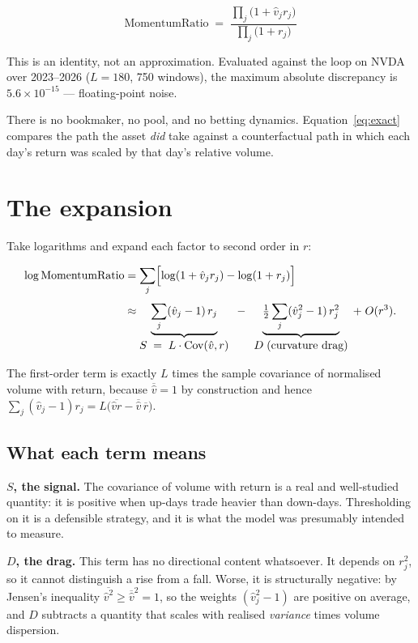 \documentclass[11pt,a4paper]{article}
\newcommand{\vhat}{\hat{v}}
\begin{document}
\begin{equation}
\boxed{\;\;
\text{MomentumRatio} \;=\; \frac{\prod_{j}\bigl(1 + \vhat_j r_j\bigr)}{\prod_{j}\bigl(1 + r_j\bigr)}
\;\;}
\label{eq:exact}
\end{equation}

This is an identity, not an approximation. Evaluated against the loop on NVDA over
2023--2026 ($L=180$, 750 windows), the maximum absolute discrepancy is
$5.6 \times 10^{-15}$ --- floating-point noise.

There is no bookmaker, no pool, and no betting dynamics. Equation~\eqref{eq:exact} compares
the path the asset \emph{did} take against a counterfactual path in which each day's return
was scaled by that day's relative volume.

\section{The expansion}

Take logarithms and expand each factor to second order in $r$:

\begin{align}
\log \text{MomentumRatio}
&= \sum_j \Bigl[ \log(1 + \vhat_j r_j) - \log(1 + r_j) \Bigr] \nonumber \\[0.3em]
&\approx \underbrace{\sum_j (\vhat_j - 1)\, r_j}_{\textstyle S \;=\; L \cdot \mathrm{Cov}(\vhat, r)}
\;\;-\;\; \underbrace{\tfrac{1}{2}\sum_j (\vhat_j^2 - 1)\, r_j^2}_{\textstyle D \;\text{(curvature drag)}}
\;+\; O(r^3).
\label{eq:expand}
\end{align}

The first-order term is exactly $L$ times the sample covariance of normalised volume with
return, because $\overline{\vhat} = 1$ by construction and hence
$\sum_j (\vhat_j - 1) r_j = L\bigl(\overline{\vhat r} - \overline{\vhat}\,\overline{r}\bigr)$.

\subsection*{What each term means}

\textbf{$S$, the signal.} The covariance of volume with return is a real and well-studied
quantity: it is positive when up-days trade heavier than down-days. Thresholding on it is a
defensible strategy, and it is what the model was presumably intended to measure.

\textbf{$D$, the drag.} This term has no directional content whatsoever. It depends on $r_j^2$,
so it cannot distinguish a rise from a fall. Worse, it is structurally negative: by Jensen's
inequality $\overline{\vhat^2} \geq \overline{\vhat}^2 = 1$, so the weights $(\vhat_j^2 - 1)$ are
positive on average, and $D$ subtracts a quantity that scales with realised \emph{variance}
times volume dispersion.
\end{document}
